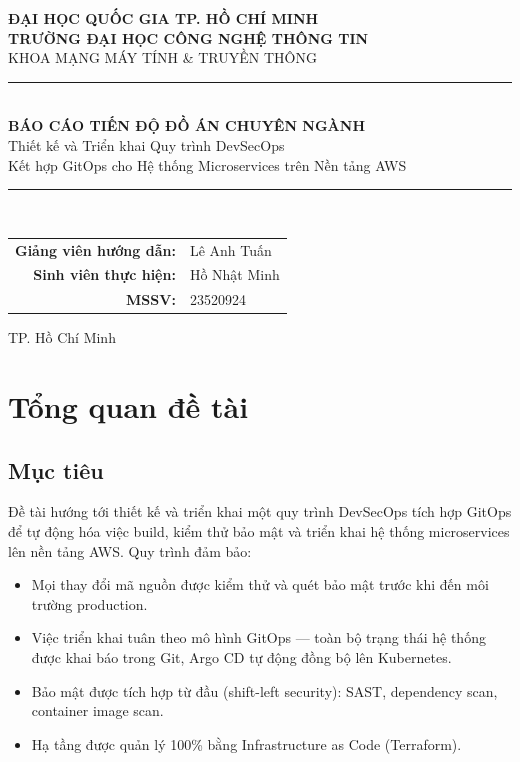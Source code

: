 \documentclass[12pt,a4paper]{article}
\begin{document}
\begin{center}
  {\Large \textbf{ĐẠI HỌC QUỐC GIA TP. HỒ CHÍ MINH}}\\[2pt]
  {\large \textbf{TRƯỜNG ĐẠI HỌC CÔNG NGHỆ THÔNG TIN}}\\[2pt]
  {\large KHOA MẠNG MÁY TÍNH \& TRUYỀN THÔNG}\\[20pt]

  \rule{\textwidth}{1pt}\\[16pt]

  {\LARGE \textbf{BÁO CÁO TIẾN ĐỘ ĐỒ ÁN CHUYÊN NGÀNH}}\\[10pt]

  {\Large Thiết kế và Triển khai Quy trình DevSecOps}\\[4pt]
  {\Large Kết hợp GitOps cho Hệ thống Microservices trên Nền tảng AWS}\\[16pt]

  \rule{\textwidth}{1pt}\\[20pt]

  \begin{tabular}{rl}
    \textbf{Giảng viên hướng dẫn:} & Lê Anh Tuấn \\[6pt]
    \textbf{Sinh viên thực hiện:}  & Hồ Nhật Minh \\[6pt]
    \textbf{MSSV:}                 & 23520924 \\[6pt]
  \end{tabular}

  \vfill
  {\normalsize TP. Hồ Chí Minh}\\[4pt]
\end{center}

\newpage

\tableofcontents
\newpage

\section{Tổng quan đề tài}

\subsection{Mục tiêu}

Đề tài hướng tới thiết kế và triển khai một quy trình DevSecOps tích hợp GitOps để tự động hóa việc build, kiểm thử bảo mật và triển khai hệ thống microservices lên nền tảng AWS. Quy trình đảm bảo:

\begin{itemize}[leftmargin=*,nosep]
  \item Mọi thay đổi mã nguồn được kiểm thử và quét bảo mật trước khi đến môi trường production.
  \item Việc triển khai tuân theo mô hình GitOps — toàn bộ trạng thái hệ thống được khai báo trong Git, Argo CD tự động đồng bộ lên Kubernetes.
  \item Bảo mật được tích hợp từ đầu (shift-left security): SAST, dependency scan, container image scan.
  \item Hạ tầng được quản lý 100\% bằng Infrastructure as Code (Terraform).
\end{itemize}
\end{document}

